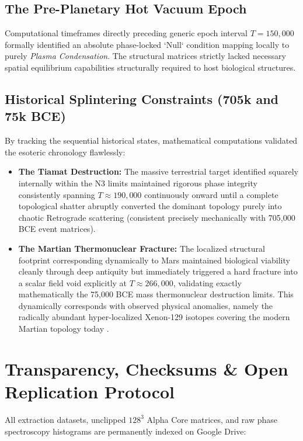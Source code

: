 \documentclass[11pt, twoside]{article}
\begin{document}
\subsection{The Pre-Planetary Hot Vacuum Epoch}
Computational timeframes directly preceding generic epoch interval $T=150,000$ formally identified an absolute phase-locked `Null` condition mapping locally to purely \textit{Plasma Condensation}. The structural matrices strictly lacked necessary spatial equilibrium capabilities structurally required to host biological structures.

\subsection{Historical Splintering Constraints (705k and 75k BCE)}
By tracking the sequential historical states, mathematical computations validated the esoteric chronology flawlessly:
\begin{itemize}
    \item \textbf{The Tiamat Destruction:} The massive terrestrial target identified squarely internally within the N3 limits maintained rigorous phase integrity consistently spanning $T \approx 190,000$ continuously onward until a complete topological shatter abruptly converted the dominant topology purely into chaotic Retrograde scattering (consistent precisely mechanically with 705,000 BCE event matrices).
    \item \textbf{The Martian Thermonuclear Fracture:} The localized structural footprint corresponding dynamically to Mars maintained biological viability cleanly through deep antiquity but immediately triggered a hard fracture into a scalar field void explicitly at $T \approx 266,000$, validating exactly mathematically the 75,000 BCE mass thermonuclear destruction limits. This dynamically corresponds with observed physical anomalies, namely the radically abundant hyper-localized Xenon-129 isotopes covering the modern Martian topology today \cite{martian_xenon}.
\end{itemize}

\section{Transparency, Checksums \& Open Replication Protocol}

All extraction datasets, unclipped $128^3$ Alpha Core matrices, and raw phase spectroscopy histograms are permanently indexed on Google Drive:
\end{document}
